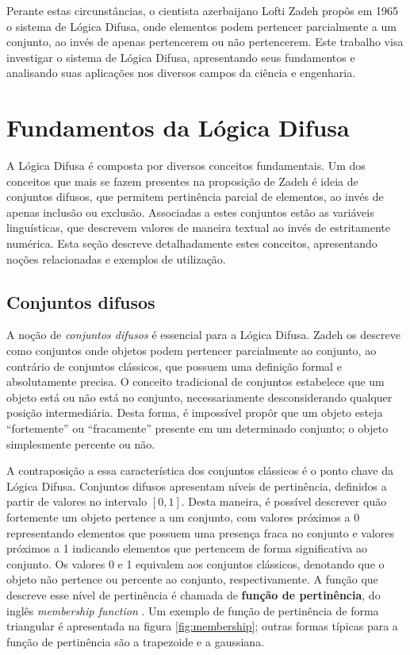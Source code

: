 \documentclass[12pt]{article}
\begin{document}
Perante estas circunstâncias, o cientista azerbaijano Lofti Zadeh propôs em 1965 o sistema de Lógica Difusa, onde elementos podem pertencer parcialmente a um conjunto, ao invés de apenas pertencerem ou não pertencerem. Este trabalho visa investigar o sistema de Lógica Difusa, apresentando seus fundamentos e analisando suas aplicações nos diversos campos da ciência e engenharia.

\section{Fundamentos da Lógica Difusa} \label{sec:fundaments}

A Lógica Difusa é composta por diversos conceitos fundamentais. Um dos conceitos que mais se fazem presentes na proposição de Zadeh é ideia de conjuntos difusos, que permitem pertinência parcial de elementos, ao invés de apenas inclusão ou exclusão. Associadas a estes conjuntos estão as variáveis linguísticas, que descrevem valores de maneira textual ao invés de estritamente numérica. Esta seção descreve detalhadamente estes conceitos, apresentando noções relacionadas e exemplos de utilização.

\subsection{Conjuntos difusos}

A noção de \textit{conjuntos difusos} é essencial para a Lógica Difusa. Zadeh os descreve como conjuntos onde objetos podem pertencer parcialmente ao conjunto, ao contrário de conjuntos clássicos, que possuem uma definição formal e absolutamente precisa. O conceito tradicional de conjuntos estabelece que um objeto está ou não está no conjunto, necessariamente desconsiderando qualquer posição intermediária. Desta forma, é impossível propôr que um objeto esteja ``fortemente'' ou ``fracamente'' presente em um determinado conjunto; o objeto simplesmente percente ou não.

A contraposição a essa característica dos conjuntos clássicos é o ponto chave da Lógica Difusa. Conjuntos difusos apresentam níveis de pertinência, definidos a partir de valores no intervalo $[0, 1]$. Desta maneira, é possível descrever quão fortemente um objeto pertence a um conjunto, com valores próximos a 0 representando elementos que possuem uma presença fraca no conjunto e valores próximos a 1 indicando elementos que pertencem de forma significativa ao conjunto. Os valores 0 e 1 equivalem aos conjuntos clássicos, denotando que o objeto não pertence ou percente ao conjunto, respectivamente. A função que descreve esse nível de pertinência é chamada de \textbf{função de pertinência}, do inglês \textit{membership function} \cite{Zadeh1965}. Um exemplo de função de pertinência de forma triangular é apresentada na figura \ref{fig:membership}; outras formas típicas para a função de pertinência são a trapezoide e a gaussiana.
\end{document}
